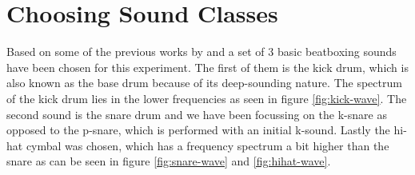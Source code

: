 \section{Choosing Sound Classes}
Based on some of the previous works by \cite{Stowell2010} and \cite{QBBB} a set of 3 basic beatboxing sounds have been chosen for this experiment. The first of them is the kick drum, which is also known as the base drum because of its deep-sounding nature. The spectrum of the kick drum lies in the lower frequencies as seen in figure \ref{fig:kick-wave}. The second sound is the snare drum and we have been focussing on the k-snare as opposed to the p-snare, which is performed with an initial k-sound. Lastly the hi-hat cymbal was chosen, which has a frequency spectrum a bit higher than the snare as can be seen in figure \ref{fig:snare-wave} and \ref{fig:hihat-wave}.

